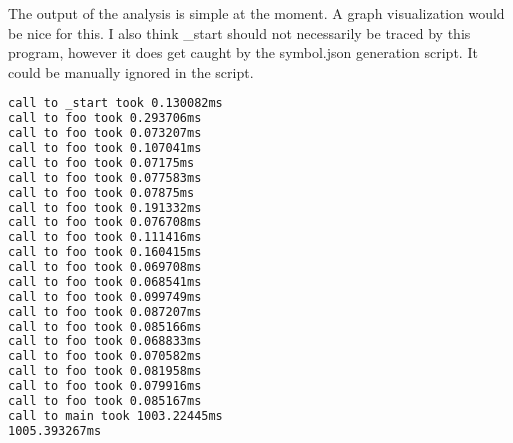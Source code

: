 \documentclass[a4paper, 12pt, english]{article}
\begin{document}
The output of the analysis is simple at the moment. A graph visualization would be nice for this.
I also think \_start should not necessarily be traced by this program, however it does get caught by the symbol.json generation script. It could be manually ignored in the script.
\begin{lstlisting}[language=sh]
call to _start took 0.130082ms
call to foo took 0.293706ms
call to foo took 0.073207ms
call to foo took 0.107041ms
call to foo took 0.07175ms
call to foo took 0.077583ms
call to foo took 0.07875ms
call to foo took 0.191332ms
call to foo took 0.076708ms
call to foo took 0.111416ms
call to foo took 0.160415ms
call to foo took 0.069708ms
call to foo took 0.068541ms
call to foo took 0.099749ms
call to foo took 0.087207ms
call to foo took 0.085166ms
call to foo took 0.068833ms
call to foo took 0.070582ms
call to foo took 0.081958ms
call to foo took 0.079916ms
call to foo took 0.085167ms
call to main took 1003.22445ms
1005.393267ms
\end{lstlisting}

%
\end{document}
